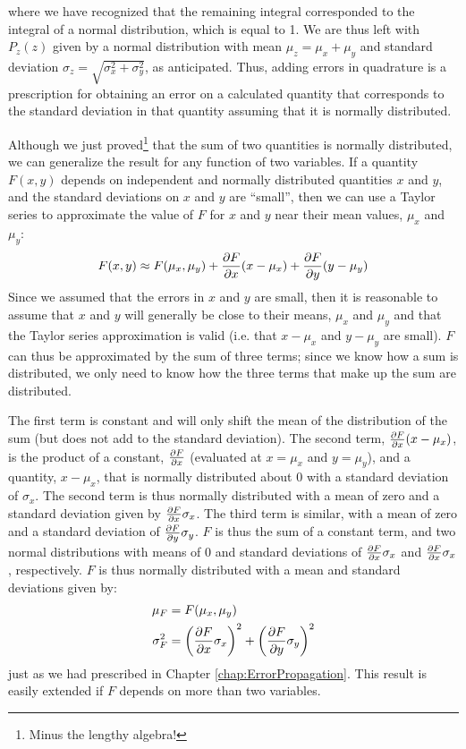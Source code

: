 where we have recognized that the remaining integral corresponded to the integral of a normal distribution, which is equal to 1. We are thus left with $P_z(z)$ given by a normal distribution with mean $\mu_z=\mu_x+\mu_y$ and standard deviation $\sigma_z=\sqrt{\sigma_x^2+\sigma_y^2}$, as anticipated. Thus, adding errors in quadrature is a prescription for obtaining an error on a calculated quantity that corresponds to the standard deviation in that quantity assuming that it is normally distributed.

Although we just proved\footnote{Minus the lengthy algebra!} that the sum of two quantities is normally distributed, we can generalize the result for any function of two variables. If a quantity $F(x,y)$ depends on independent and normally distributed quantities $x$ and $y$, and the standard deviations on $x$ and $y$ are ``small'', then we can use a Taylor series to approximate the value of $F$ for $x$ and $y$ near their mean values, $\mu_x$ and $\mu_y$:
\begin{align*}
F(x,y) \approx F(\mu_x,\mu_y)+\frac{\partial F}{\partial x}(x-\mu_x)+\frac{\partial F}{\partial y}(y-\mu_y)
\end{align*}
Since we assumed that the errors in $x$ and $y$ are small, then it is reasonable to assume that $x$ and $y$ will generally be close to their means, $\mu_x$ and $\mu_y$ and that the Taylor series approximation is valid (i.e. that $x-\mu_x$ and $y-\mu_y$ are small). $F$ can thus be approximated by the sum of three terms; since we know how a sum is distributed, we only need to know how the three terms that make up the sum are distributed.

The first term is constant and will only shift the mean of the distribution of the sum (but does not add to the standard deviation). The second term, $\frac{\partial F}{\partial x}(x-\mu_x)$, is the product of a constant, $\frac{\partial F}{\partial x}$ (evaluated at $x=\mu_x$ and $y=\mu_y$), and a quantity, $x-\mu_x$, that is normally distributed about 0 with a standard deviation of $\sigma_x$. The second term is thus normally distributed with a mean of zero and a standard deviation given by $\frac{\partial F}{\partial x}\sigma_x$. The third term is similar, with a mean of zero and a standard deviation of $\frac{\partial F}{\partial y}\sigma_y$. $F$ is thus the sum of a constant term, and two normal distributions with means of 0 and standard deviations of $\frac{\partial F}{\partial x}\sigma_x$ and $\frac{\partial F}{\partial x}\sigma_x$, respectively. $F$ is thus normally distributed with a mean and standard deviations given by:
\begin{align}
\label{eqn:normerror}
\mu_F &=F(\mu_x,\mu_y)\nonumber\\
\sigma_F^2&=\left(\frac{\partial F}{\partial x}\sigma_x\right)^2+\left(\frac{\partial F}{\partial y}\sigma_y\right)^2
\end{align}
just as we had prescribed in Chapter \ref{chap:ErrorPropagation}. This result is easily extended if $F$ depends on more than two variables.

